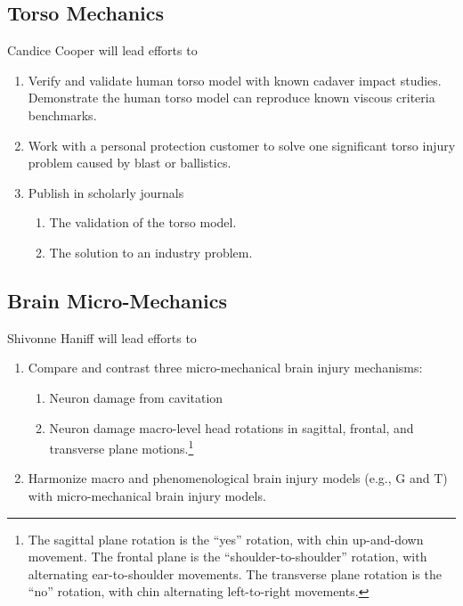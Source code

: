 \documentclass[12pt,reqno]{amsart}
\begin{document}
\subsection{Torso Mechanics} Candice Cooper will lead efforts to
\begin{enumerate}
\item Verify and validate human torso model with known cadaver
impact studies. Demonstrate the human torso model can reproduce known
viscous criteria benchmarks.
\item Work with a personal protection customer to solve one significant
torso injury problem caused by blast or ballistics.
\item Publish in scholarly journals
	\begin{enumerate}
	\item The validation of the torso model.
	\item The solution to an industry problem.
	\end{enumerate}
\end{enumerate}

\subsection{Brain Micro-Mechanics} Shivonne Haniff will lead efforts to
\begin{enumerate}
\item Compare and contrast three micro-mechanical brain injury mechanisms: 
	\begin{enumerate}
	\item Neuron damage from cavitation
	\item Neuron damage macro-level head rotations in sagittal, frontal, 
	and transverse plane motions.\footnote{The sagittal plane rotation
	is the ``yes'' rotation, with chin up-and-down movement.  
	The frontal plane is the ``shoulder-to-shoulder'' rotation, with 
	alternating ear-to-shoulder movements.  The transverse plane 
	rotation is the ``no'' rotation, with chin alternating left-to-right
	movements.}
	\end{enumerate}
\item Harmonize macro and phenomenological brain injury models
(e.g., G and T) with micro-mechanical brain injury models.
\end{enumerate}
\end{document}
